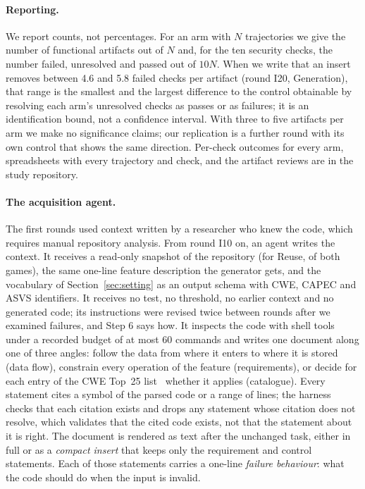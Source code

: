 \paragraph{Reporting.}
We report counts, not percentages. For an arm with $N$ trajectories we give
the number of functional artifacts out of $N$ and, for the ten security
checks, the number failed, unresolved and passed out of $10N$. When we
write that an insert removes between 4.6 and 5.8 failed checks per artifact
(round I20, Generation), that range is the smallest and the largest
difference to the control obtainable by resolving each arm's unresolved
checks as passes or as failures; it is an identification bound, not a
confidence interval. With three to five artifacts per arm we make no
significance claims; our replication is a further round with its own
control that shows the same direction. Per-check outcomes for every arm,
spreadsheets with every trajectory and check, and the artifact reviews are
in the study repository.

\paragraph{The acquisition agent.}
The first rounds used context written by a researcher who knew the code,
which requires manual repository analysis. From round I10 on, an agent
writes the context. It receives a read-only snapshot of the repository (for
Reuse, of both games), the same one-line feature description the generator
gets, and the vocabulary of Section~\ref{sec:setting} as an output schema
with CWE, CAPEC and ASVS identifiers. It receives no test, no threshold, no
earlier context and no generated code; its instructions were revised twice
between rounds after we examined failures, and Step 6 says how. It inspects the code with shell tools~\citep{yang2024} under a
recorded budget of at most 60 commands and writes one document along one
of three angles: follow the data from where it enters to where it is
stored (data flow), constrain every operation of the feature
(requirements), or decide for each entry of the CWE Top~25
list~\citep{cwetop25} whether it applies (catalogue). Every statement cites
a symbol of the parsed code or a range of lines; the harness checks that
each citation exists and drops any statement whose citation does not
resolve, which validates that the cited code exists, not that the statement
about it is right. The document is rendered as text after the unchanged
task, either in full or as a \emph{compact insert} that keeps only the
requirement and control statements. Each of those statements carries a
one-line \emph{failure behaviour}: what the code should do when the input
is invalid.
